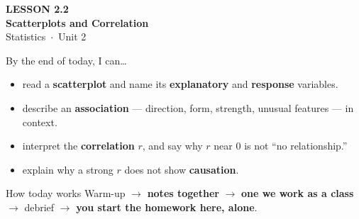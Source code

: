 \documentclass[aspectratio=169, 11pt]{beamer}
\begin{document}
{
\begin{frame}[plain]
  \vspace{2.8cm}\hspace{0.55cm}%
  \begin{minipage}{0.9\textwidth}
    {\color{goldacc}\bfseries\small LESSON 2.2}\\[0.5cm]
    {\color{white}\bfseries\LARGE Scatterplots and Correlation}\\[1.2cm]
    {\color{skymid}\small Statistics~$\cdot$~Unit 2}
  \end{minipage}
\end{frame}
}

\newcommand{\redink}[1]{{\color{redacc}\bfseries #1}}

\begin{frame}[t, plain]
  By the end of today, I can\ldots
  \begin{itemize}\setlength{\itemsep}{5pt}
    \item read a \textbf{scatterplot} and name its \textbf{explanatory} and
          \textbf{response} variables.
    \item describe an \textbf{association} --- direction, form, strength, unusual features ---
          in context.
    \item interpret the \textbf{correlation} $r$, and say why $r$ near 0 is not ``no
          relationship.''
    \item explain why a strong $r$ does not show \textbf{causation}.
  \end{itemize}
  \begin{block}{How today works}
    Warm-up $\to$ \textbf{notes together} $\to$ \textbf{one we work as a class} $\to$
    debrief $\to$ \textbf{you start the homework here, alone}.
  \end{block}
\end{frame}
\end{document}
